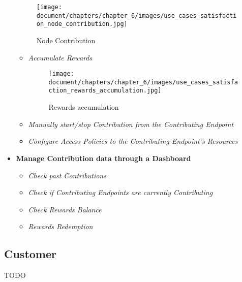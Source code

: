 \begin{itemize}
    \begin{figure}[!ht]
        \centering
        \texttt{[image: document/chapters/chapter\_6/images/use\_cases\_satisfaction\_node\_contribution.jpg]}
        \caption{Node Contribution}
        \label{fig:use_cases_satisfaction_node_contribution}
    \end{figure}

    \begin{itemize}
        \item \textit{Accumulate Rewards}\\
        \begin{figure}[!ht]
            \centering
            \texttt{[image: document/chapters/chapter\_6/images/use\_cases\_satisfaction\_rewards\_accumulation.jpg]}
            \caption{Rewards accumulation}
            \label{fig:use_cases_satisfaction_rewards_accumulation}
        \end{figure}
        \item \textit{Manually start/stop Contribution from the Contributing Endpoint}\\
        \item \textit{Configure Access Policies to the Contributing Endpoint's Resources}\\
    \end{itemize}
    \item \textbf{Manage Contribution data through a Dashboard}\\
    \begin{itemize}
        \item \textit{Check past Contributions}\\
        \item \textit{Check if Contributing Endpoints are currently Contributing}\\
        \item \textit{Check Rewards Balance}\\
        \item \textit{Rewards Redemption}\\
    \end{itemize}
\end{itemize}

\subsection{Customer}
TODO

